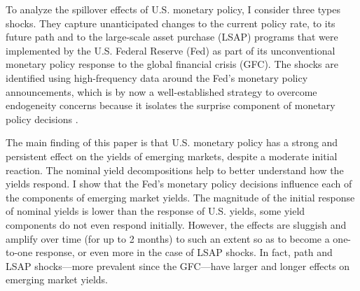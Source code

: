 {To analyze the spillover effects of U.S. monetary policy, I consider
three types shocks.
They capture unanticipated changes to the current policy rate, to its future path and 
to the large-scale asset purchase (LSAP) programs that were implemented by the U.S. Federal Reserve (Fed) as part of its unconventional monetary policy response to the global financial crisis (GFC).
The shocks are identified using high-frequency data around the Fed's monetary policy announcements, which is by now a well-established strategy to overcome endogeneity concerns because it isolates the surprise component of monetary policy decisions \citep{GurkaynakWright:2013,NakamuraSteinsson:2018JEP}.

The main finding of this paper is that U.S. monetary policy has a strong and persistent effect on the yields of emerging markets, despite a moderate initial reaction.
The nominal yield decompositions help to better understand how the yields respond.
I show that the Fed's monetary policy decisions influence each of the components of emerging market yields.
The magnitude of the initial response of nominal yields is lower than the response of U.S. yields, some yield components do not even respond initially.
However, the effects are sluggish and amplify over time (for up to 2 months) to such an extent so as to become a one-to-one response, or even more in the case of LSAP shocks.
In fact, path and LSAP shocks---more prevalent since the GFC---have larger and longer effects on emerging market yields.

}
